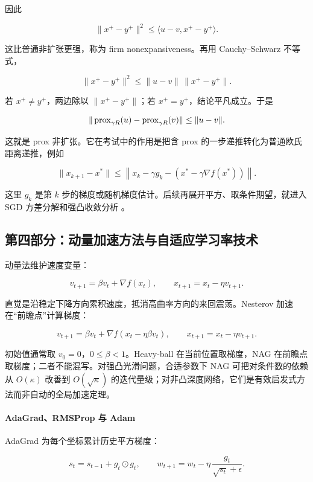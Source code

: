因此

\[
  \|x^+-y^+\|^2
  \le
  \langle u-v,x^+-y^+\rangle.
\]

这比普通非扩张更强，称为 firm nonexpansiveness。再用 Cauchy--Schwarz 不等式，

\[
  \|x^+-y^+\|^2
  \le
  \|u-v\|\,\|x^+-y^+\|.
\]

若 \(x^+\ne y^+\)，两边除以 \(\|x^+-y^+\|\)；若 \(x^+=y^+\)，结论平凡成立。于是

\[
  \|\operatorname{prox}_{\gamma R}(u)-\operatorname{prox}_{\gamma R}(v)\|
  \le
  \|u-v\|.
\]

这就是 prox 非扩张。它在考试中的作用是把含 prox 的一步递推转化为普通欧氏距离递推，例如

\[
  \|x_{k+1}-x^*\|
  \le
  \left\|
    x_k-\gamma g_k
    -
    \left(x^*-\gamma\nabla f(x^*)\right)
  \right\|.
\]

这里 \(g_k\) 是第 \(k\) 步的梯度或随机梯度估计。后续再展开平方、取条件期望，就进入 SGD 方差分解和强凸收敛分析 \parencite{beck2017first,nesterov2018convex}。

\subsection{第四部分：动量加速方法与自适应学习率技术}

动量法维护速度变量：

\[
  v_{t+1}=\beta v_t+\nabla f(x_t),
  \qquad
  x_{t+1}=x_t-\eta v_{t+1}.
\]

直觉是沿稳定下降方向累积速度，抵消高曲率方向的来回震荡。Nesterov 加速在“前瞻点”计算梯度：

\[
  v_{t+1}
  =
  \beta v_t+\nabla f(x_t-\eta\beta v_t),
  \qquad
  x_{t+1}=x_t-\eta v_{t+1}.
\]

\begin{remark}[动量与加速的边界]
初始值通常取 \(v_0=0\)，\(0\le\beta<1\)。Heavy-ball 在当前位置取梯度，NAG 在前瞻点取梯度；二者不能混写。对强凸光滑问题，合适参数下 NAG 可把对条件数的依赖从 \(O(\kappa)\) 改善到 \(O(\sqrt{\kappa})\) 的迭代量级；对非凸深度网络，它们是有效启发式方法而非自动的全局加速定理。
\end{remark}

\paragraph{AdaGrad、RMSProp 与 Adam}

AdaGrad 为每个坐标累计历史平方梯度：

\[
  s_t=s_{t-1}+g_t\odot g_t,
  \qquad
  w_{t+1}=w_t-\eta\,\frac{g_t}{\sqrt{s_t}+\epsilon}.
\]

